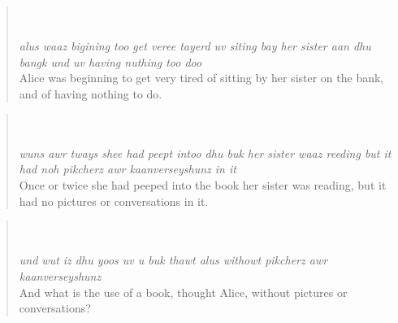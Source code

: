 \begin{quote}\noindent {}\\[2pt]
\\[1pt]
\textit{alus waaz bigining too get veree tayerd uv siting bay her sister aan dhu bangk und uv having nuthing too doo}\\[1pt]
Alice was beginning to get very tired of sitting by her sister on the bank, and of having nothing to do.
\end{quote}
\begin{quote}\noindent {}\\[2pt]
\\[1pt]
\textit{wuns awr tways shee had peept intoo dhu buk her sister waaz reeding but it had noh pikcherz awr kaanverseyshunz in it}\\[1pt]
Once or twice she had peeped into the book her sister was reading, but it had no pictures or conversations in it.
\end{quote}
\begin{quote}\noindent {}\\[2pt]
\\[1pt]
\textit{und wut iz dhu yoos uv u buk thawt alus withowt pikcherz awr kaanverseyshunz}\\[1pt]
And what is the use of a book, thought Alice, without pictures or conversations?
\end{quote}